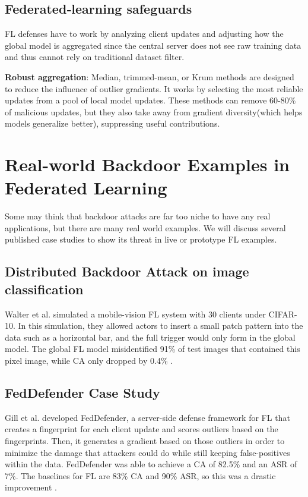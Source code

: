\documentclass[sigconf,authorversion,nonacm,balance=false]{acmart}
\begin{document}
\subsection{Federated‑learning safeguards}
\label{sec:fldefense}

FL defenses have to work by analyzing client updates and adjusting how the global model is aggregated since the central server does not see raw training data and thus cannot rely on traditional dataset filter. 

\textbf{Robust aggregation}: Median, trimmed-mean, or Krum methods are designed to reduce the influence of outlier gradients. It works by selecting the most reliable updates from a pool of local model updates. These methods can remove 60-80\% of malicious updates, but they also take away from gradient diversity(which helps models generalize better), suppressing useful contributions. \cite{background_attack_defense_goldblum_2023}


\section{Real-world Backdoor Examples in Federated Learning}

Some may think that backdoor attacks are far too niche to have any real applications, but there are many real world examples. We will discuss several published case studies to show its threat in live or prototype FL examples.

\subsection{Distributed Backdoor Attack on image classification}
Walter et al. simulated a mobile-vision FL system with 30 clients under CIFAR-10. In this simulation, they allowed actors to insert a small patch pattern into the data such as a horizontal bar, and the full trigger would only form in the global model. The global FL model misidentified 91\% of test images that contained this pixel image, while CA only dropped by 0.4\% \cite{casestudy_walter_2024}.

\subsection{FedDefender Case Study}
Gill et al. developed FedDefender, a server-side defense framework for FL that creates a fingerprint for each client update and scores outliers based on the fingerprints. Then, it generates a gradient based on those outliers in order to minimize the damage that attackers could do while still keeping false-positives within the data. FedDefender was able to achieve a CA of 82.5\% and an ASR of 7\%. The baselines for FL are 83\% CA and 90\% ASR, so this was a drastic improvement \cite{casestudy_defense_gill_2023}.
\end{document}
